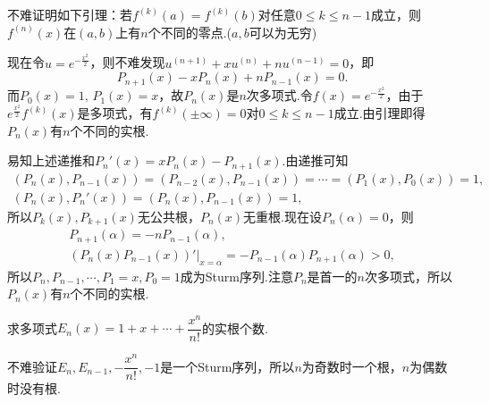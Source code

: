 \begin{sol}[法一]
	不难证明如下引理：若$f^{(k)}(a)=f^{(k)}(b)$对任意$0\le k\le n-1$成立，则$f^{(n)}(x)$在$(a,b)$上有$n$个不同的零点.($a,b$可以为无穷)

	现在令$u=e^{-\frac{x^2}{2}}$，则不难发现$u^{(n+1)}+xu^{(n)}+nu^{(n-1)}=0$，即
	\[
		P_{n+1}(x)-xP_n(x)+nP_{n-1}(x)=0.
	\]
	而$P_0(x)=1,\,P_1(x)=x$，故$P_n(x)$是$n$次多项式.令$f(x)=e^{-\frac{x^2}{2}}$，由于$e^{\frac{x^2}{2}}f^{(k)}(x)$是多项式，有$f^{(k)}(\pm\infty)=0$对$0\le k\le n-1$成立.由引理即得$P_n(x)$有$n$个不同的实根.
\end{sol}
\begin{sol}[法二]
	易知上述递推和$P_n'(x)=xP_n(x)-P_{n+1}(x)$.由递推可知
	\begin{gather*}
		(P_n(x),P_{n-1}(x))=(P_{n-2}(x),P_{n-1}(x))=\cdots=(P_1(x),P_0(x))=1,\\
		(P_n(x),P_n'(x))=(P_n(x),P_{n-1}(x))=1,
	\end{gather*}
	所以$P_k(x),P_{k+1}(x)$无公共根，$P_n(x)$无重根.现在设$P_n(\alpha)=0$，则
	\begin{gather*}
		P_{n+1}(\alpha)=-nP_{n-1}(\alpha),\\
		(P_n(x)P_{n-1}(x))'\Big|_{x=\alpha}=-P_{n-1}(\alpha)P_{n+1}(\alpha)>0,
	\end{gather*}
	所以$P_n,P_{n-1},\cdots,P_1=x,P_0=1$成为Sturm序列.注意$P_n$是首一的$n$次多项式，所以$P_n(x)$有$n$个不同的实根.
\end{sol}
\begin{prob}[7]
	求多项式$E_n(x)=1+x+\cdots+\dfrac{x^n}{n!}$的实根个数.
\end{prob}
\begin{sol}
	不难验证$E_n,E_{n-1},-\dfrac{x^n}{n!},-1$是一个Sturm序列，所以$n$为奇数时一个根，$n$为偶数时没有根.
\end{sol}
